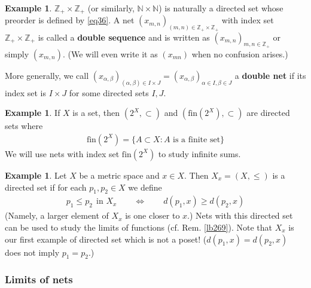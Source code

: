 \documentclass[12pt,b5paper,notitlepage]{article}
\theoremstyle{definition}
\newtheorem{eg}[df]{Example}
\theoremstyle{plain}
\newcommand{\Nbb}{\mathbb N}
\newcommand{\Zbb}{\mathbb Z}
\newcommand{\fin}{\mathrm{fin}}
\numberwithin{equation}{section}
\begin{document}
\begin{eg}
$\Zbb_+\times\Zbb_+$ (or similarly, $\Nbb\times\Nbb$) is naturally a directed set whose preorder is defined by \eqref{eq36}. A net $(x_{m,n})_{(m,n)\in\Zbb_+\times\Zbb_+}$ with index set $\Zbb_+\times\Zbb_+$ is called a \textbf{double sequence}  and is written as $(x_{m,n})_{m,n\in\Zbb_+}$ or simply $(x_{m,n})$. (We will even write it as $(x_{mn})$ when no confusion arises.)

More generally, we call $(x_{\alpha,\beta})_{(\alpha,\beta)\in I\times J}=(x_{\alpha,\beta})_{\alpha\in I,\beta\in J}$ a \textbf{double net}  if its index set is $I\times J$ for some directed sets $I,J$. \hfill\qedsymbol
\end{eg}




\begin{eg}\label{lb130}
If $X$ is a set, then $(2^X,\subset)$ and $(\fin(2^X),\subset)$ \index{fin@$\fin(2^X)$} are directed sets where
\begin{align}
\fin(2^X)=\{A\subset X:A\text{ is a finite set}\}
\end{align}
We will use nets with index set $\fin(2^X)$ to study infinite sums.
\end{eg}


\begin{eg}
Let $X$ be a metric space and $x\in X$. Then $X_x=(X,\leq)$ is a directed set if for each $p_1,p_2\in X$ we define
\begin{align}
p_1\leq p_2~~\text{in }X_x\qquad\Longleftrightarrow\qquad d(p_1,x)\geq d(p_2,x)
\end{align}
(Namely, a larger element of $X_x$ is one closer to $x$.) Nets with this directed set can be used to study the limits of functions (cf. Rem. \ref{lb269}). Note that $X_x$ is our first example of directed set which is not a poset! ($d(p_1,x)=d(p_2,x)$ does not imply $p_1=p_2$.)
\end{eg}


\subsubsection{Limits of nets}
\end{document}
